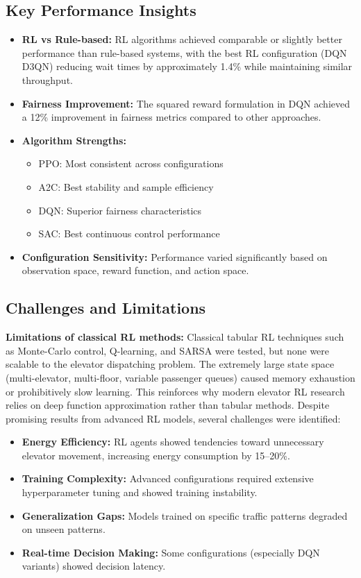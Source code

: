 \documentclass[10pt,twocolumn]{article}
\begin{document}
\subsection{Key Performance Insights}
\begin{itemize}
    \item \textbf{RL vs Rule-based:} RL algorithms achieved comparable or slightly better performance than rule-based systems, with the best RL configuration (DQN D3QN) reducing wait times by approximately 1.4\% while maintaining similar throughput.
    \item \textbf{Fairness Improvement:} The squared reward formulation in DQN achieved a 12\% improvement in fairness metrics compared to other approaches.
    \item \textbf{Algorithm Strengths:}
    \begin{itemize}
        \item PPO: Most consistent across configurations
        \item A2C: Best stability and sample efficiency
        \item DQN: Superior fairness characteristics
        \item SAC: Best continuous control performance
    \end{itemize}
    \item \textbf{Configuration Sensitivity:} Performance varied significantly based on observation space, reward function, and action space.
\end{itemize}

\subsection{Challenges and Limitations}
\textbf{Limitations of classical RL methods:} Classical tabular RL techniques such as Monte-Carlo control, Q-learning, and SARSA were tested, but none were scalable to the elevator dispatching problem. The extremely large state space (multi-elevator, multi-floor, variable passenger queues) caused memory exhaustion or prohibitively slow learning. This reinforces why modern elevator RL research relies on deep function approximation rather than tabular methods.
Despite promising results from advanced RL models, several challenges were identified:

\begin{itemize}
    \item \textbf{Energy Efficiency:} RL agents showed tendencies toward unnecessary elevator movement, increasing energy consumption by 15--20\%.
    \item \textbf{Training Complexity:} Advanced configurations required extensive hyperparameter tuning and showed training instability.
    \item \textbf{Generalization Gaps:} Models trained on specific traffic patterns degraded on unseen patterns.
    \item \textbf{Real-time Decision Making:} Some configurations (especially DQN variants) showed decision latency.
\end{itemize}
\end{document}
